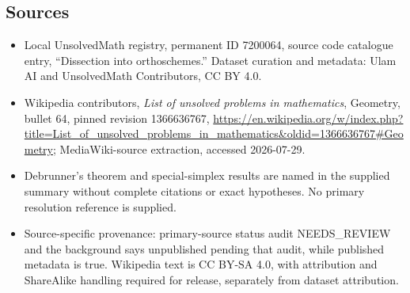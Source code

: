 \documentclass[11pt]{article}
\begin{document}
\subsection{Sources}
\begin{itemize}
\item Local UnsolvedMath registry, permanent ID 7200064, source code catalogue entry, ``Dissection into orthoschemes.'' Dataset curation and metadata: Ulam AI and UnsolvedMath Contributors, CC BY 4.0.
\item Wikipedia contributors, \emph{List of unsolved problems in mathematics}, Geometry, bullet 64, pinned revision 1366636767, \url{https://en.wikipedia.org/w/index.php?title=List_of_unsolved_problems_in_mathematics&oldid=1366636767#Geometry}; MediaWiki-source extraction, accessed 2026-07-29.
\item Debrunner's theorem and special-simplex results are named in the supplied summary without complete citations or exact hypotheses. No primary resolution reference is supplied.
\item Source-specific provenance: primary-source status audit NEEDS\_REVIEW and the background says unpublished pending that audit, while published metadata is true. Wikipedia text is CC BY-SA 4.0, with attribution and ShareAlike handling required for release, separately from dataset attribution.
\end{itemize}
\end{document}
